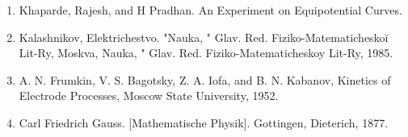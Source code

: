 \documentclass{article}
\begin{document}
  
  
\begin{enumerate}
\item Khaparde, Rajesh, and H Pradhan. An Experiment on Equipotential Curves.
\item Kalashnikov, Elektrichestvo. "Nauka, " Glav. Red. Fiziko-Matematicheskoĭ Lit-Ry, Moskva, Nauka, " Glav. Red. Fiziko-Matematicheskoy Lit-Ry, 1985.
\item A. N. Frumkin, V. S. Bagotsky, Z. A. Iofa, and B. N. Kabanov, Kinetics of Electrode Processes, Moscow State University, 1952.
\item Carl Friedrich Gauss. [Mathematische Physik]. Gottingen, Dieterich, 1877.

\end{enumerate}
\end{document}
